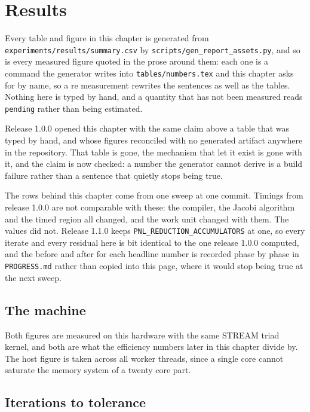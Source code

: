 \chapter{Results}
\label{ch:results}

Every table and figure in this chapter is generated from
\texttt{experiments/results/summary.csv} by \texttt{scripts/gen\_report\_assets.py},
and so is every measured figure quoted in the prose around them: each one is a
command the generator writes into \texttt{tables/numbers.tex} and this chapter
asks for by name, so a re measurement rewrites the sentences as well as the
tables. Nothing here is typed by hand, and a quantity that has not been measured
reads \texttt{pending} rather than being estimated.

Release 1.0.0 opened this chapter with the same claim above a table that was
typed by hand, and whose figures reconciled with no generated artifact anywhere
in the repository. That table is gone, the mechanism that let it exist is gone
with it, and the claim is now checked: a number the generator cannot derive is a
build failure rather than a sentence that quietly stops being true.

The \pnlConfigurations{} rows behind this chapter come from one sweep at one
commit. Timings from release 1.0.0 are not comparable with these: the compiler,
the Jacobi algorithm and the timed region all changed, and the work unit changed
with them. The values did not. Release 1.1.0 keeps
\texttt{PNL\_REDUCTION\_ACCUMULATORS} at one, so every iterate and every
residual here is bit identical to the one release 1.0.0 computed, and the before
and after for each headline number is recorded phase by phase in
\texttt{PROGRESS.md} rather than copied into this page, where it would stop being
true at the next sweep.

\section{The machine}



Both figures are measured on this hardware with the same STREAM triad kernel,
and both are what the efficiency numbers later in this chapter divide by. The
host figure is taken across all worker threads, since a single core cannot
saturate the memory system of a twenty core part.

\section{Iterations to tolerance}
\label{sec:convergence-results}

